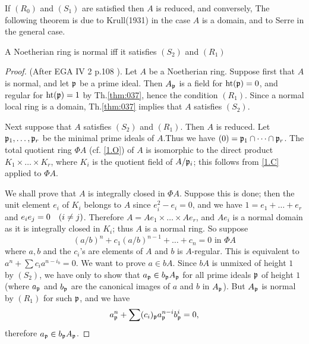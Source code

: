 \documentclass[../main]{subfiles}
\begin{document}
If $(R_0)$ and $(S_1)$ are satisfied then $A$ is reduced, and conversely, The following theorem is due to Krull(1931) in the case $A$ is a domain, and to Serre in the general case.
\begin{theorem}\label{thm:039}
A Noetherian ring is normal iff it satisfies $(S_2)$ and $(R_1)$
\end{theorem}
\begin{proof}
(After EGA IV 2 p.108 \cite{egaIV}). Let $A$ be a Noetherian ring.
Suppose first that $A$ is normal, and let $\mathfrak{p}$ be a prime ideal. Then $A_{\mathfrak{p}}$ is a field for $\operatorname{ht}(\mathfrak{p})=0$, and regular for $\operatorname{ht}(\mathfrak{p})=1$ by Th.\ref{thm:037}, hence the condition $(R_1)$. Since a normal local ring is a domain, Th.\ref{thm:037} implies that $A$ satisfies $(S_2)$.

Next suppose that $A$ satisfies $(S_2)$ and $(R_1)$. Then $A$ is reduced. Let $\mathfrak{p}_1, \dots, \mathfrak{p}_r$ be the minimal prime ideals of $A$.Thus we have $(0)=\mathfrak{p}_1 \cap \dots \cap \mathfrak{p}_{r}$. The total quotient ring $\Phi A$ (cf. \ref{1.O}) of $A$ is isomorphic to the direct product $K_1 \times \ldots \times K_r$, where $K_i$ is the quotient field of $A / \mathfrak{p}_i$; this follows from \ref{1.C} applied to $\Phi A$.

We shall prove that $A$ is integrally closed in $\Phi A$. Suppose this is done; then the unit element $e_i$ of $K_i$ belongs to $A$ since $e_i^2-e_i=0$, and we have $1=e_1+\ldots+e_r$ and $e_i e_j=0\for{i \neq j}$. Therefore $A=Ae_1 \times \dots \times Ae_r$, and $A e_i$ is a normal domain as it is integrally closed in $K_i$; thus $A$ is a normal ring. So suppose
\[(a / b)^n+c_1(a / b)^{n-1}+\ldots+c_n=0 \text { in } \Phi A\]
where $a, b$ and the $c_i$'s are elements of $A$ and $b$ is $A$-regular. This is equivalent to $a^n+\sum c_i a^{n-i_b}=0$. We want to prove $a\in bA$. Since $bA$ is unmixed of height $1$ by $(S_2)$, we have only to show that $a_{\mathfrak{p}} \in b_{\mathfrak{p}} A_{\mathfrak{p}}$ for all prime ideals $\mathfrak{p}$ of height $1$ (where $a_{\mathfrak{p}}$ and $b_{\mathfrak{p}}$ are the canonical images of $a$ and $b$ in $A_{\mathfrak{p}}$). But $A_{\mathfrak{p}}$ is normal by $(R_1)$ for such $\mathfrak{p}$, and we have \[a_{\mathfrak{p}}^n+\sum (c_i)_{\mathfrak{p}} a_{\mathfrak{p}}^{n-i} b_{\mathfrak{p}}^i=0,\] therefore $a_{\mathfrak{p}}\in b_{\mathfrak{p}} A_{\mathfrak{p}}$.
\end{proof}
\end{document}
